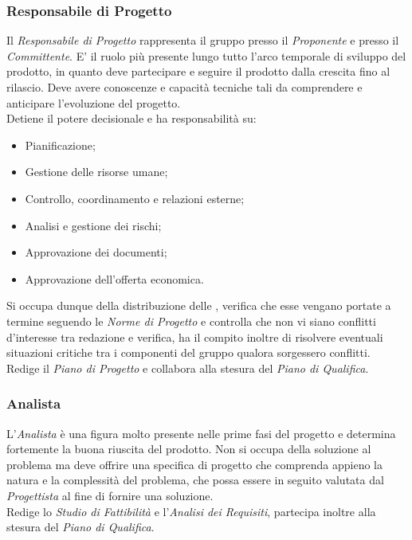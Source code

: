 \documentclass{scalatekids-article}
\begin{document}
\subsubsection{Responsabile di Progetto}

Il \textit{Responsabile di Progetto} rappresenta il gruppo presso il \textit{Proponente}
e presso il \textit{Committente}. E' il ruolo più presente lungo tutto l'arco temporale di
sviluppo del prodotto, in quanto deve partecipare e seguire il prodotto dalla
crescita fino al rilascio. Deve avere conoscenze e capacità
tecniche tali da comprendere e anticipare l'evoluzione del progetto.\\
Detiene il potere decisionale e ha responsabilità su:
\begin{itemize}
    \item Pianificazione;
    \item Gestione delle risorse umane;
    \item Controllo, coordinamento e relazioni esterne;
    \item Analisi e gestione dei rischi;
    \item Approvazione dei documenti;
    \item Approvazione dell'offerta economica.
\end{itemize}
Si occupa dunque della distribuzione delle , verifica che esse vengano
portate a termine seguendo le \textit{Norme di Progetto} e controlla che non vi
siano conflitti d'interesse tra redazione e verifica, ha il compito inoltre di
risolvere eventuali situazioni critiche tra i componenti del gruppo qualora
sorgessero conflitti.\\ Redige il \textit{Piano di Progetto} e collabora alla
stesura del \textit{Piano di Qualifica}.

\subsubsection{Analista}

L'\textit{Analista} è una figura molto presente nelle prime fasi del progetto e
determina fortemente la buona riuscita del prodotto. Non si occupa della
soluzione al problema ma deve offrire una specifica di progetto che comprenda
appieno la natura e la complessità del problema, che possa essere in seguito
valutata dal \textit{Progettista} al fine di fornire una soluzione.\\ Redige lo
\textit{Studio di Fattibilità} e l'\textit{Analisi dei Requisiti}, partecipa
inoltre alla stesura del \textit{Piano di Qualifica}.
\end{document}
